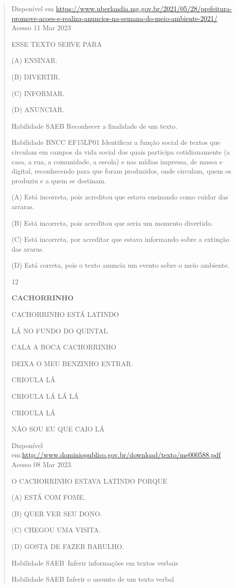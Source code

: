 {{{{\begin{verse}
{{\begin{escolha}
{{{{{Disponível em
\url{https://www.uberlandia.mg.gov.br/2021/05/28/prefeitura-promove-acoes-e-realiza-anuncios-na-semana-do-meio-ambiente-2021/}
Acesso 11 Mar 2023

ESSE TEXTO SERVE PARA

(A) ENSINAR.

(B) DIVERTIR.

(C) INFORMAR.

(D) ANUNCIAR.

Habilidade SAEB Reconhecer a finalidade de um texto.

Habilidade BNCC EF15LP01 Identificar a função social de textos que
circulam em campos da vida social dos quais participa cotidianamente (a
casa, a rua, a comunidade, a escola) e nas mídias impressa, de massa e
digital, reconhecendo para que foram produzidos, onde circulam, quem os
produziu e a quem se destinam.

(A) Está incorreta, pois acreditou que estava ensinando como cuidar das
arraras.

(B) Está incorreta, pois acreditou que seria um momento divertido.

(C) Está incorreta, por acreditar que estava informando sobre a extinção
das araras.

(D) Está correta, pois o texto anuncia um evento sobre o meio ambiente.

\num{12}

\textbf{CACHORRINHO}

CACHORRINHO ESTÁ LATINDO

LÁ NO FUNDO DO QUINTAL

CALA A BOCA CACHORRINHO

DEIXA O MEU BENZINHO ENTRAR.

CRIOULA LÁ

CRIOULA LÁ LÁ LÁ

CRIOULA LÁ

NÃO SOU EU QUE CAIO LÁ

Disponível
em:\url{http://www.dominiopublico.gov.br/download/texto/me000588.pdf}
Acesso 08 Mar 2023.

O CACHORRINHO ESTAVA LATINDO PORQUE

(A) ESTÁ COM FOME.

(B) QUER VER SEU DONO.

(C) CHEGOU UMA VISITA.

(D) GOSTA DE FAZER BARULHO.

Habilidade SAEB~Inferir informações em textos verbais

Habilidade SAEB Inferir o assunto de um texto verbal

}}}}}
\end{escolha}}}
\end{verse}}}}}
